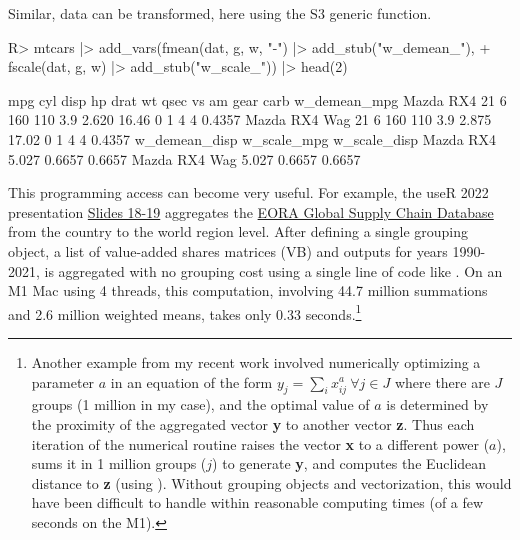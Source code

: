 \documentclass[article]{jss}
\newcommand{\fct}[1]{\code{#1()}}
\begin{document}
%
Similar, data can be transformed, here using the S3 generic \fct{fscale} function.
%
\begin{Schunk}
\begin{Sinput}
R> mtcars |> add_vars(fmean(dat, g, w, "-") |> add_stub("w_demean_"),
+                     fscale(dat, g, w) |> add_stub("w_scale_")) |> head(2)
\end{Sinput}
\begin{Soutput}
              mpg cyl disp  hp drat    wt  qsec vs am gear carb w_demean_mpg
Mazda RX4      21   6  160 110  3.9 2.620 16.46  0  1    4    4       0.4357
Mazda RX4 Wag  21   6  160 110  3.9 2.875 17.02  0  1    4    4       0.4357
              w_demean_disp w_scale_mpg w_scale_disp
Mazda RX4             5.027      0.6657       0.6657
Mazda RX4 Wag         5.027      0.6657       0.6657
\end{Soutput}
\end{Schunk}
%
This programming access can become very useful. For example, the useR 2022 presentation \href{https://raw.githubusercontent.com/SebKrantz/collapse/master/misc/useR2022\%20presentation/collapse_useR2022_final.pdf}{Slides 18-19} aggregates the \href{https://worldmrio.com/}{EORA Global Supply Chain Database} from the country to the world region level. After defining a single grouping object, a list of value-added shares matrices (VB) and outputs for years 1990-2021, is aggregated with no grouping cost using a single line of code like . On an M1 Mac using 4 threads, this computation, involving 44.7 million summations and 2.6 million weighted means, takes only 0.33 seconds.\footnote{Another example from my recent work involved numerically optimizing a parameter $a$ in an equation of the form $y_j = \sum_i x_{ij}^a\ \forall j\in J$ where there are $J$ groups (1 million in my case), and the optimal value of $a$ is determined by the proximity of the aggregated vector \textbf{y} to another vector \textbf{z}. Thus each iteration of the numerical routine raises the vector \textbf{x} to a different power ($a$), sums it in 1 million groups ($j$) to generate \textbf{y}, and computes the Euclidean distance to \textbf{z} (using ). Without grouping objects and vectorization, this would have been difficult to handle within reasonable computing times (of a few seconds on the M1).}
%
\end{document}
